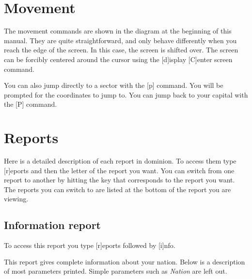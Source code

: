 \section{Movement}
The movement commands are shown in the diagram at the beginning of
this manual.  They are quite straightforward, and only behave
differently when you reach the edge of the screen.  In this case, the
screen is shifted over.  The screen can be forcibly centered around
the cursor using the [d]isplay [C]enter screen command.

You can also jump directly to a sector with the [p] command.  You will
be prompted for the coordinates to jump to.  You can jump back to your
capital with the [P] command.

\section{Reports}
Here is a detailed description of each report in dominion. To access
them type [r]eports and then the letter of the report you want. You
can switch from one report to another by hitting the key that
corresponds to the report you want.  The reports you can switch to are
listed at the bottom of the report you are viewing.

\subsection{Information report}
To access this report you type [r]eports followed by [i]nfo.

This report gives complete information about your nation.  Below is a
description of most parameters printed.  Simple parameters such as
{\em Nation} are left out.

